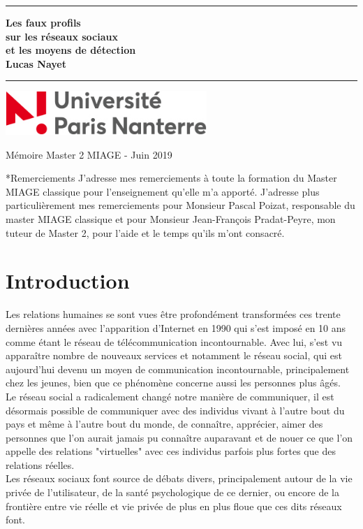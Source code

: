 \documentclass[12pt]{report}
\newcommand{\LMUTitle}[9]{
  \thispagestyle{empty}
  \vspace*{\stretch{1}}
  {\parindent0cm
   \rule{\linewidth}{.7ex}}
  \begin{flushright}

    \vspace*{\stretch{1}}
    \sffamily\bfseries\Huge
    #1\\
    \vspace*{\stretch{1}}
    \sffamily\bfseries\large
    #2
    \vspace*{\stretch{1}}
  \end{flushright}
  \rule{\linewidth}{.7ex}
  \vspace*{\stretch{5}}
  \begin{center}
    \includegraphics[width=3in]{UPN-logo.jpg}
  \end{center}
  \vspace*{\stretch{1}}
  \begin{center}\sffamily\LARGE{#3}\end{center}
  \newpage
  \thispagestyle{empty}
}
\begin{document}
  \LMUTitle
      {Les faux profils\\
      sur les réseaux sociaux\\
      et les moyens de détection}              
      {Lucas Nayet}                       
      {Mémoire Master 2 MIAGE - Juin 2019}                          
\thispagestyle{empty}

\setcounter{page}{}
\chapter*{Remerciements}
J'adresse mes remerciements à toute la formation du Master MIAGE classique pour l'enseignement qu'elle m'a apporté. J'adresse plus particulièrement mes remerciements pour Monsieur Pascal Poizat, responsable du master MIAGE classique et pour Monsieur Jean-François Pradat-Peyre, mon tuteur de Master 2, pour l'aide et le temps qu'ils m'ont consacré. 

\makeatletter
\def\@makechapterhead#1{%
  \vspace*{50\p@}%
  {\parindent \z@ \raggedright \normalfont
    \Huge \bfseries #1\par\nobreak
    \vskip 40\p@
  }}
\makeatother

\renewcommand{\contentsname}{Sommaire}
{\tableofcontents}

\chapter{Introduction}
Les relations humaines se sont vues être profondément transformées ces trente dernières années avec l'apparition d'Internet en 1990 qui s'est imposé en 10 ans comme étant le réseau de télécommunication incontournable. Avec lui, s'est vu apparaître nombre de nouveaux services et notamment le réseau social, qui est aujourd'hui devenu un moyen de communication incontournable, principalement chez les jeunes, bien que ce phénomène concerne aussi les personnes plus âgés.\\

Le réseau social a radicalement changé notre manière de communiquer, il est désormais possible de communiquer avec des individus vivant à l'autre bout du pays et même à l'autre bout du monde, de connaître, apprécier, aimer des personnes que l'on aurait jamais pu connaître auparavant et de nouer ce que l'on appelle des relations "virtuelles" avec ces individus parfois plus fortes que des relations réelles. \\


Les réseaux sociaux font source de débats divers, principalement autour de la vie privée de l'utilisateur, de la santé psychologique de ce dernier, ou encore de la frontière entre vie réelle et vie privée de plus en plus floue que ces dits réseaux font. \\
\end{document}
